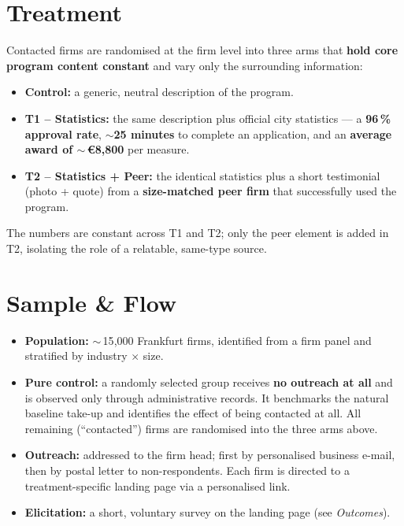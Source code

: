 \documentclass[10pt,a4paper]{article}
\newcommand{\heading}[1]{{\sffamily\bfseries\color{gublue}#1}}
\begin{document}
\section*{Treatment}
Contacted firms are randomised at the firm level into three arms that
\textbf{hold core program content constant} and vary only the surrounding
information:
\begin{itemize}
  \item \heading{Control:} a generic, neutral description of the program.
  \item \heading{T1 -- Statistics:} the same description plus official
        city statistics --- a \textbf{96\,\% approval rate}, \textbf{$\sim$25
        minutes} to complete an application, and an \textbf{average award
        of $\sim$\,\euro{}8{,}800} per measure.
  \item \heading{T2 -- Statistics + Peer:} the identical statistics plus a
        short testimonial (photo + quote) from a \textbf{size-matched peer
        firm} that successfully used the program.
\end{itemize}
The numbers are constant across T1 and T2; only the peer element is added
in T2, isolating the role of a relatable, same-type source.

\section*{Sample \& Flow}
\begin{itemize}
  \item \heading{Population:} $\sim$\,15{,}000 Frankfurt firms, identified
        from a firm panel and stratified by industry $\times$ size.
  \item \heading{Pure control:} a randomly selected group receives
        \textbf{no outreach at all} and is observed only through
        administrative records. It benchmarks the natural baseline take-up
        and identifies the effect of being contacted at all. All remaining
        (``contacted'') firms are randomised into the three arms above.
  \item \heading{Outreach:} addressed to the firm head; first by
        personalised business e-mail, then by postal letter to
        non-respondents. Each firm is directed to a treatment-specific
        landing page via a personalised link.
  \item \heading{Elicitation:} a short, voluntary survey on the landing
        page (see \textit{Outcomes}).
\end{itemize}
\end{document}
